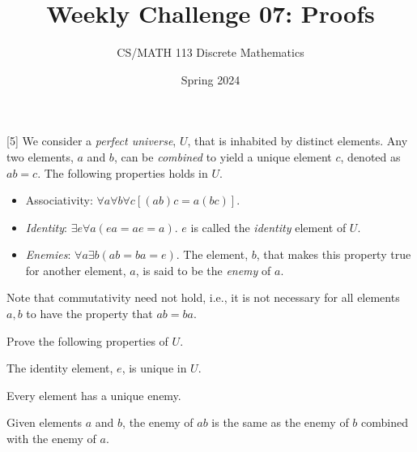\documentclass[a4paper]{exam}
\title{Weekly Challenge 07: Proofs}
\author{CS/MATH 113 Discrete Mathematics}
\date{Spring 2024}
\begin{document}
\maketitle

\begin{questions}

[5]
  We consider a \textit{perfect universe}, $U$, that is inhabited by distinct elements. Any two elements, $a$ and $b$, can be \textit{combined} to yield a unique element $c$, denoted as $ab=c$. The following properties holds in $U$.
  \begin{itemize}
  \item Associativity: $\forall a\forall b\forall c [(ab)c = a(bc)]$. 
  \item \textit{Identity}: $\exists e\forall a (ea=ae=a)$. $e$ is called the \textit{identity} element of $U$.
  \item \textit{Enemies}: $\forall a\exists b (ab= ba = e)$. The element, $b$, that makes this property true for another element, $a$, is said to be the \textit{enemy} of $a$.
  \end{itemize}
  Note that commutativity need not hold, i.e., it is not necessary for all elements $a, b$ to have the property that $ab=ba$.

  Prove the following properties of $U$.
  \begin{parts}
  \item The identity element, $e$, is unique in $U$.
    \begin{solution}
    \end{solution}
  \item Every element has a unique enemy.
    \begin{solution}
    \end{solution}
  \item Given elements $a$ and $b$, the enemy of $ab$ is the same as the enemy of $b$ combined with the enemy of $a$.
    \begin{solution}
    \end{solution}
  \end{parts}

\end{questions}
\end{document}
